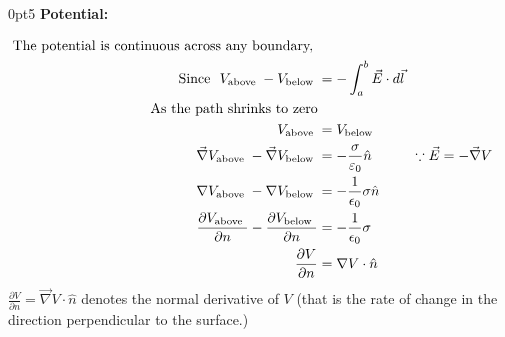 \opencutright
\renewcommand\windowpagestuff{
	\centering\texttt{[image: e boundary2]}}
\begin{cutout}{0}{\dimexpr\linewidth-3.5cm\relax}{0pt}{5}
	\textbf{Potential:}
	
	\begin{align}
	\text{The potential is continuous across any boundary, }\notag\\
	\text{Since }\ V_{\text {above }}-V_{\text {below }}&=-\int_{a}^{b} \vec{E} \cdot d \vec{l}\notag\\
	\text{As the path shrinks to zero}\notag\\
	V_{\text {above }}&=V_{\text {below }} \notag\\
	\vec{\nabla} V_{\text {above }}-\vec{\nabla} V_{\text {below }}&=-\frac{\sigma}{\varepsilon_{0}} \hat{n}\hspace{1cm} \because\vec{E}=-\vec{\nabla} V \\
	\nabla V_{\text {above }}-\nabla V_{\text {below }}&=-\frac{1}{\epsilon_{0}} \sigma \hat{n} \notag \\
	\frac{\partial V_{\text {above }}}{\partial n}-\frac{\partial V_{\text {below }}}{\partial n}&=-\frac{1}{\epsilon_{0}} \sigma \notag\\
	\frac{\partial V}{\partial n}&=\nabla V \cdot \hat{{n}}
	\end{align}
	$\frac{\partial V}{\partial n}=\vec{\nabla} V \cdot \hat{n}$ denotes the normal derivative of $V$ (that is the rate of change in the direction perpendicular to the surface.)
\end{cutout}

\begin{center}
\end{center}








